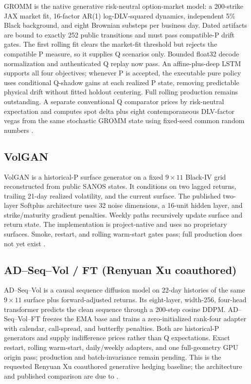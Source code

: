 \documentclass[10pt]{article}
\begin{document}
GROMM is the native generative risk-neutral option-market model: a 200-strike
JAX market fit, 16-factor AR(1) log-DLV-squared dynamics, independent 5\% Black
background, and eight Brownian substeps per business day. Dated artifacts are
bound to exactly 252 public transitions and must pass compatible-P drift gates.
The first rolling fit clears the market-fit threshold but rejects the compatible
P measure, so it supplies Q scenarios only. Bounded float32 decode
normalization and authenticated Q replay now pass. An affine-plus-deep LSTM
supports all four objectives; whenever P is accepted, the executable pure
policy uses conditional Q-shadow gains at each realized P state, removing
predictable physical drift without fitted holdout centering. Full rolling
production remains outstanding. A separate conventional Q comparator prices
by risk-neutral expectation and computes spot delta plus eight contemporaneous
DLV-factor vegas from the same stochastic GROMM state using fixed-seed common
random numbers \citep{GROMM2026}.

\subsection{VolGAN}

VolGAN is a historical-P surface generator on a fixed $9\times11$ Black-IV
grid reconstructed from public SANOS states. It conditions on two lagged
returns, trailing 21-day realized volatility, and the current surface. The
published two-layer Softplus architecture uses 32 noise dimensions, a 16-unit
hidden layer, and strike/maturity gradient penalties. Weekly paths recursively
update surface and return state. The implementation is project-native and uses
no proprietary surfaces. Smoke, restart, and rolling warm-start gates pass;
full production does not yet exist \citep{VuleticCont2024}.

\subsection{AD--Seq--Vol / FT (Renyuan Xu coauthored)}

AD--Seq--Vol is a causal sequence diffusion model on 22-day histories of the
same $9\times11$ surface plus forward-adjusted returns. Its eight-layer,
width-256, four-head transformer predicts the clean sequence through a 200-step
cosine DDPM. AD--Seq--Vol--FT freezes the EMA base and trains a zero-initialized
rank-four adapter with calendar, call-spread, and butterfly penalties. Both are
historical-P generators and supply indifference prices rather than Q
expectations. Exact restart, rolling warm-start, daily/weekly adapters, and one
full-geometry GPU origin pass; production and batch-invariance remain pending.
This is the requested Renyuan Xu coauthored generative hedging baseline; the
architecture and published comparison are due to \citet{HanEtAl2026}.
\end{document}

